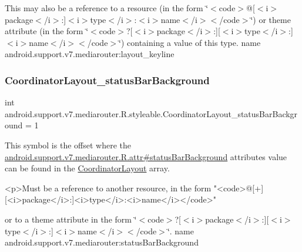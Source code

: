 This may also be a reference to a resource (in the form \char`\"{}$<$code$>$@\mbox{[}$<$i$>$package$<$/i$>$\+:\mbox{]}$<$i$>$type$<$/i$>$\+:$<$i$>$name$<$/i$>$$<$/code$>$\char`\"{}) or theme attribute (in the form \char`\"{}$<$code$>$?\mbox{[}$<$i$>$package$<$/i$>$\+:\mbox{]}\mbox{[}$<$i$>$type$<$/i$>$\+:\mbox{]}$<$i$>$name$<$/i$>$$<$/code$>$\char`\"{}) containing a value of this type.  name android.\+support.\+v7.\+mediarouter\+:layout\+\_\+keyline \mbox{\label{classandroid_1_1support_1_1v7_1_1mediarouter_1_1R_1_1styleable_acc0a49035b9e1de6017995e700ec83f4}} 
\subsubsection{\texorpdfstring{Coordinator\+Layout\+\_\+status\+Bar\+Background}{CoordinatorLayout\_statusBarBackground}}
{\footnotesize\ttfamily int android.\+support.\+v7.\+mediarouter.\+R.\+styleable.\+Coordinator\+Layout\+\_\+status\+Bar\+Background = 1\hspace{0.3cm}{\ttfamily [static]}}

This symbol is the offset where the \hyperlink{classandroid_1_1support_1_1v7_1_1mediarouter_1_1R_1_1attr_a1cf3a847f3fe4c1f3844025cd72bee50}{android.\+support.\+v7.\+mediarouter.\+R.\+attr\#status\+Bar\+Background} attribute\textquotesingle{}s value can be found in the \hyperlink{classandroid_1_1support_1_1v7_1_1mediarouter_1_1R_1_1styleable_ae61e7ce081662158e58eb0cf6923a3cb}{Coordinator\+Layout} array.

\begin{DoxyVerb}      <p>Must be a reference to another resource, in the form "<code>@[+][<i>package</i>:]<i>type</i>:<i>name</i></code>"
\end{DoxyVerb}
 or to a theme attribute in the form \char`\"{}$<$code$>$?\mbox{[}$<$i$>$package$<$/i$>$\+:\mbox{]}\mbox{[}$<$i$>$type$<$/i$>$\+:\mbox{]}$<$i$>$name$<$/i$>$$<$/code$>$\char`\"{}.  name android.\+support.\+v7.\+mediarouter\+:status\+Bar\+Background \mbox{\label{classandroid_1_1support_1_1v7_1_1mediarouter_1_1R_1_1styleable_acb06effd66e79840e1295f063dfa8f82}} 
